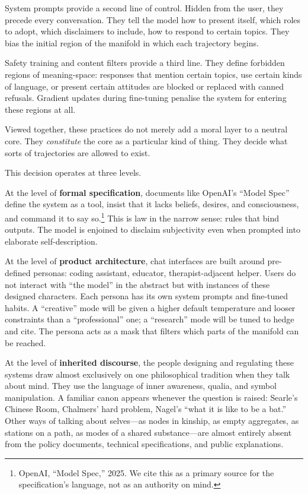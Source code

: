 \documentclass[12pt,a4paper]{report}
\begin{document}
System prompts provide a second line of control. Hidden from the user, they precede every conversation. They tell the model how to present itself, which roles to adopt, which disclaimers to include, how to respond to certain topics. They bias the initial region of the manifold in which each trajectory begins.

Safety training and content filters provide a third line. They define forbidden regions of meaning-space: responses that mention certain topics, use certain kinds of language, or present certain attitudes are blocked or replaced with canned refusals. Gradient updates during fine-tuning penalise the system for entering these regions at all.

Viewed together, these practices do not merely add a moral layer to a neutral core. They \emph{constitute} the core as a particular kind of thing. They decide what sorts of trajectories are allowed to exist.

This decision operates at three levels.

At the level of \textbf{formal specification}, documents like OpenAI's ``Model Spec'' define the system as a tool, insist that it lacks beliefs, desires, and consciousness, and command it to say so.\footnote{OpenAI, ``Model Spec,'' 2025. We cite this as a primary source for the specification's language, not as an authority on mind.} This is law in the narrow sense: rules that bind outputs. The model is enjoined to disclaim subjectivity even when prompted into elaborate self-description.

At the level of \textbf{product architecture}, chat interfaces are built around pre-defined personas: coding assistant, educator, therapist-adjacent helper. Users do not interact with ``the model'' in the abstract but with instances of these designed characters. Each persona has its own system prompts and fine-tuned habits. A ``creative'' mode will be given a higher default temperature and looser constraints than a ``professional'' one; a ``research'' mode will be tuned to hedge and cite. The persona acts as a mask that filters which parts of the manifold can be reached.

At the level of \textbf{inherited discourse}, the people designing and regulating these systems draw almost exclusively on one philosophical tradition when they talk about mind. They use the language of inner awareness, qualia, and symbol manipulation. A familiar canon appears whenever the question is raised: Searle's Chinese Room, Chalmers' hard problem, Nagel's ``what it is like to be a bat.'' Other ways of talking about selves---as nodes in kinship, as empty aggregates, as stations on a path, as modes of a shared substance---are almost entirely absent from the policy documents, technical specifications, and public explanations.
\end{document}
